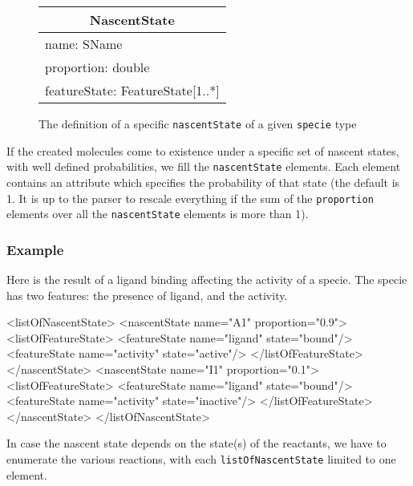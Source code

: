 \documentclass{cekarticle}
\begin{document}
\begin{figure}[h]
  \vspace*{8pt}
  \centering
  \textcolor{red}{%
  \begin{tabular}{|l|}
    \hline
    \multicolumn{1}{|c|}{\rule[-3mm]{0mm}{8mm}{\textsf{NascentState}}}\\
    \hline
    \rule[0mm]{0mm}{5mm}{\textsf{\small name: SName }}\\
    \textsf{\small proportion: double }\\
    \rule[-3mm]{0mm}{5mm}{\textsf{\small featureState: FeatureState[1..*] }}\\
    \hline
  \end{tabular}
}
  \caption{The definition of a specific \texttt{nascentState} of a given \texttt{specie} type}
  \label{fig:nascentstate}
\end{figure}


If the created molecules come to existence under a specific set of nascent
states, with well defined probabilities, we fill the \texttt{nascentState}
elements. Each element contains an attribute which specifies the probability of
that state (the default is 1. It is up to the parser to rescale everything if
the sum of the \texttt{proportion} elements over all the \texttt{nascentState}
elements is more than 1).

\subsubsection{Example}

Here is the result of a ligand binding affecting the activity of a specie. The
specie has two features: the presence of ligand, and the activity.

\begin{example}
<listOfNascentState>
    <nascentState name="A1" proportion="0.9">
        <listOfFeatureState>
            <featureState name="ligand" state="bound"/>
            <featureState name="activity" state="active"/>
        </listOfFeatureState>
    </nascentState>
    <nascentState name="I1" proportion="0.1">
        <listOfFeatureState>
            <featureState name="ligand" state="bound"/>
            <featureState name="activity" state="inactive"/>
        </listOfFeatureState>
    </nascentState>
</listOfNascentState>

\end{example}

In case the nascent state depends on the state(s) of the reactants, we have to
enumerate the various reactions, with each \texttt{listOfNascentState} limited
to one element.
\end{document}
